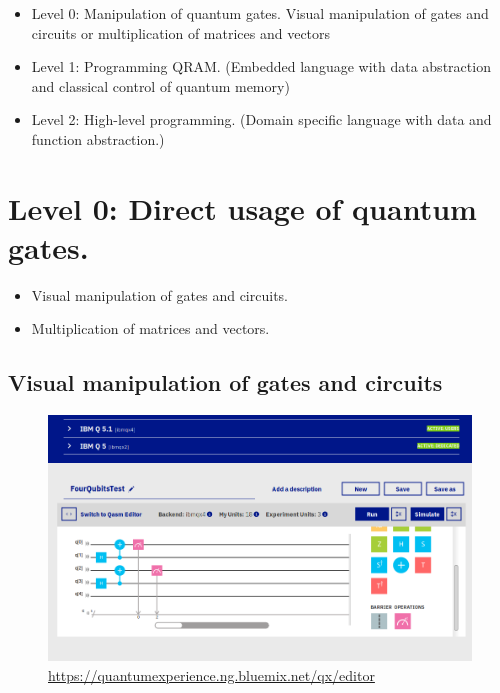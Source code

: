 \documentclass[a4paper,11pt]{article}
\begin{document}
\begin{itemize}
    \item  Level 0: Manipulation of quantum gates.
    Visual manipulation of gates and circuits or multiplication 
        of matrices and vectors
    
    \item Level 1: Programming QRAM. (Embedded language 
        with data abstraction and classical control of quantum memory)
    
    \item Level 2: High-level programming. (Domain specific 
        language with data and function abstraction.)
\end{itemize}

\section{Level 0: Direct usage of quantum gates.}

\begin{itemize}
\item Visual manipulation of gates and circuits.
\item Multiplication of matrices and vectors.
\end{itemize}

\subsection{Visual manipulation of gates and circuits}

\begin{figure}[ht!]
\centering
\includegraphics[width=\textwidth]{../slides/pics/ibm-q-experience-composer.png}
\caption{\url{https://quantumexperience.ng.bluemix.net/qx/editor}}
\end{figure}
\end{document}
